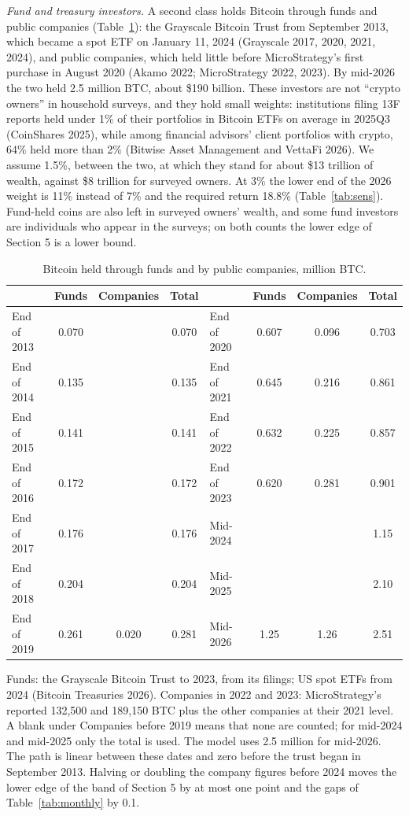 \documentclass[11pt]{article}
\begin{document}
\emph{Fund and treasury investors.} A second class holds Bitcoin through funds and public companies (Table~\ref{tab:funds}): the Grayscale Bitcoin Trust from September 2013, which became a spot ETF on January 11, 2024 (Grayscale 2017, 2020, 2021, 2024), and public companies, which held little before MicroStrategy's first purchase in August 2020 (Akamo 2022; MicroStrategy 2022, 2023). By mid-2026 the two held 2.5 million BTC, about \$190 billion. These investors are not ``crypto owners'' in household surveys, and they hold small weights: institutions filing 13F reports held under 1\% of their portfolios in Bitcoin ETFs on average in 2025Q3 (CoinShares 2025), while among financial advisors' client portfolios with crypto, 64\% held more than 2\% (Bitwise Asset Management and VettaFi 2026). We assume 1.5\%, between the two, at which they stand for about \$13 trillion of wealth, against \$8 trillion for surveyed owners. At 3\% the lower end of the 2026 weight is 11\% instead of 7\% and the required return 18.8\% (Table~\ref{tab:sens}). Fund-held coins are also left in surveyed owners' wealth, and some fund investors are individuals who appear in the surveys; on both counts the lower edge of Section 5 is a lower bound.

\begin{table}[ht]\centering\small
\caption{Bitcoin held through funds and by public companies, million BTC.}
\label{tab:funds}
\begin{tabular}{lccc@{\hskip 2.5em}lccc}
\toprule
 & Funds & Companies & Total & & Funds & Companies & Total \\
\midrule
End of 2013 & 0.070 & & 0.070 & End of 2020 & 0.607 & 0.096 & 0.703 \\
End of 2014 & 0.135 & & 0.135 & End of 2021 & 0.645 & 0.216 & 0.861 \\
End of 2015 & 0.141 & & 0.141 & End of 2022 & 0.632 & 0.225 & 0.857 \\
End of 2016 & 0.172 & & 0.172 & End of 2023 & 0.620 & 0.281 & 0.901 \\
End of 2017 & 0.176 & & 0.176 & Mid-2024 & & & 1.15 \\
End of 2018 & 0.204 & & 0.204 & Mid-2025 & & & 2.10 \\
End of 2019 & 0.261 & 0.020 & 0.281 & Mid-2026 & 1.25 & 1.26 & 2.51 \\
\bottomrule
\end{tabular}
\par\smallskip\parbox{0.86\textwidth}{\footnotesize Funds: the Grayscale Bitcoin Trust to 2023, from its filings; US spot ETFs from 2024 (Bitcoin Treasuries 2026). Companies in 2022 and 2023: MicroStrategy's reported 132,500 and 189,150 BTC plus the other companies at their 2021 level. A blank under Companies before 2019 means that none are counted; for mid-2024 and mid-2025 only the total is used. The model uses 2.5 million for mid-2026. The path is linear between these dates and zero before the trust began in September 2013. Halving or doubling the company figures before 2024 moves the lower edge of the band of Section 5 by at most one point and the gaps of Table~\ref{tab:monthly} by 0.1.}
\end{table}
\end{document}
